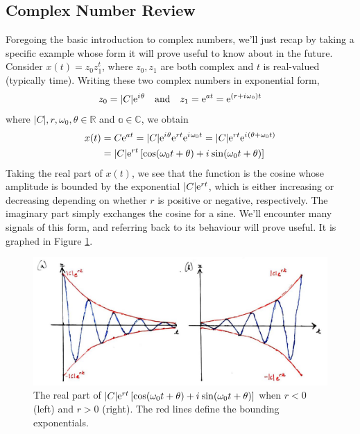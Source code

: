 \subsection{Complex Number Review}
%
Foregoing the basic introduction to complex numbers, we'll just recap by taking a specific
example whose form it will prove useful to know about in the future. Consider
$x(t) = z_0z_1^t$, where $z_0,z_1$ are both complex and $t$ is real-valued (typically time).
Writing these two complex numbers in exponential form,
%
\begin{displaymath}
  z_0 = |C|\mathrm{e}^{{i\mkern1mu}\theta} \quad\mathrm{and}\quad z_1 = \mathrm{e}^{at} = \mathrm{e}^{(r + {i\mkern1mu}\omega_0)t}
\end{displaymath}
%
where $|C|,r,\omega_0,\theta\in\mathbb{R}$ and $\mathbb{a}\in\mathbb{C}$, we obtain
%
\begin{align*}
  x(t) &= C\mathrm{e}^{at} = |C|\mathrm{e}^{{i\mkern1mu}\theta}\mathrm{e}^{rt}\mathrm{e}^{{i\mkern1mu}\omega_0 t} = |C|\mathrm{e}^{rt}\mathrm{e}^{{i\mkern1mu}(\theta + \omega_0 t)} \\
  &= |C|\mathrm{e}^{rt}\left[ \cos(\omega_0 t + \theta) + {i\mkern1mu}\sin(\omega_0 t + \theta) \right]
\end{align*}
%
Taking the real part of $x(t)$, we see that the function is the cosine whose amplitude is
bounded by the exponential $|C|\mathrm{e}^{rt}$, which is either increasing or decreasing depending
on whether $r$ is positive or negative, respectively. The imaginary part simply exchanges
the cosine for a sine. We'll encounter many signals of this form, and referring back to its
behaviour will prove useful. It is graphed in Figure \ref{fig::lecture_1_complex_numbers}.\\
%
\begin{figure}[!htb]
  \includegraphics[width=\textwidth]{images/lecture_1_complex_numbers.JPG}
  \caption{
    The real part of
    $|C|\mathrm{e}^{rt}\left[ \cos(\omega_0 t + \theta) + {i\mkern1mu}\sin(\omega_0 t + \theta) \right]$
    when $r < 0$ (left) and $r > 0$ (right). The red lines define the bounding exponentials.
  }
  \label{fig::lecture_1_complex_numbers}
\end{figure}

